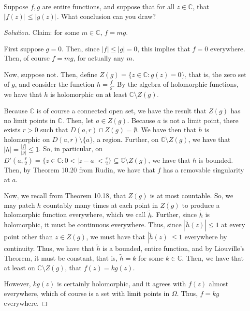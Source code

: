 \documentclass[10pt]{article}
\newenvironment{problem}[2][]{\begin{trivlist}
\item[\hskip \labelsep {\bfseries #1}\hskip \labelsep {\bfseries #2.}]}{\end{trivlist}}
\begin{document}
\begin{problem}{Question 3}

Suppose $f, g$ are entire functions, and suppose that for all $z \in \mathbb{C}$, that $| f(z) | \leq | g(z)|$. What conclusion can you draw?

\end{problem}

\begin{proof}[Solution]

Claim: for some $m \in \mathbb{C}$, $f = mg$.

First suppose $g = 0$. Then, since $|f| \leq |g| = 0$, this implies that $f = 0$ everywhere. Then, of course $f = mg$, for actually any $m$.

Now, suppose not. Then, define $Z(g) = \{ z \in \mathbb{C} : g(z) = 0 \}$, that is, the zero set of $g$, and consider the function $h = \frac{f}{g}$. By the algebra of holomorphic functions, we have that $h$ is holomorphic on at least $\mathbb{C} \setminus Z(g)$.

Because $\mathbb{C}$ is of course a connected open set, we have the result that $Z(g)$ has no limit points in $\mathbb{C}$. Then, let $a \in Z(g)$. Because $a$ is not a limit point, there exists $r > 0$ such that $D(a,r) \cap Z(g) = \emptyset$. We have then that $h$ is holomorphic on $D(a,r) \setminus \{ a \}$, a region. Further, on $\mathbb{C} \setminus Z(g)$, we have that $|h| = \frac{|f|}{|g|} \leq 1$. So, in particular, on $D'(a,\frac{r}{2}) = \{ z \in \mathbb{C} : 0 < |z - a| < \frac{r}{2} \} \subseteq \mathbb{C} \setminus Z(g)$, we have that $h$ is bounded. Then, by Theorem 10.20 from Rudin, we have that $f$ has a removable singularity at $a$.

Now, we recall from Theorem 10.18, that $Z(g)$ is at most countable. So, we may patch $h$ countably many times at each point in $Z(g)$ to produce a holomorphic function everywhere, which we call $\tilde{h}$. Further, since $\tilde{h}$ is holomorphic, it must be continuous everywhere. Thus, since $|\tilde{h}(z)| \leq 1$ at every point other than $z \in Z(g)$, we must have that $|\tilde{h}(z)| \leq 1$ everywhere by continuity. Thus, we have that $\tilde{h}$ is a bounded, entire function, and by Liouville's Theorem, it must be constant, that is, $\tilde{h} = k$ for some $k \in \mathbb{C}$. Then, we have that at least on $\mathbb{C} \setminus Z(g)$, that $f(z) = k g(z)$.

However, $k g(z)$ is certainly holomorphic, and it agrees with $f(z)$ almost everywhere, which of course is a set with limit points in $\Omega$. Thus, $f = kg$ everywhere.


\end{proof}
\end{document}
